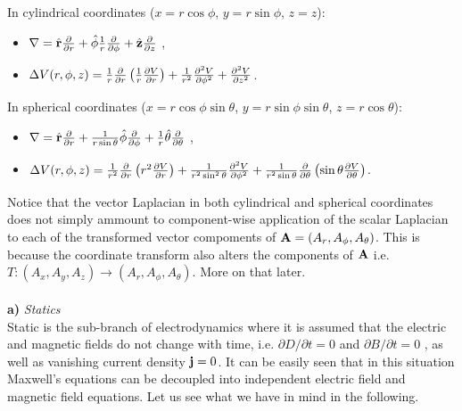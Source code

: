 \documentclass[11pt,a4paper]{report}
\def\Nabla{\ensuremath\bm{\nabla}}
\def\bm{\ensuremath\mathbf}
\def\lap{\ensuremath\Delta}
\begin{document}
In cylindrical coordinates ($x=r\cos\phi$, $y = r\sin\phi$, $z = z$): 
\begin{itemize}
  \item {$\Nabla = \hat{\bm {r}} \frac{\partial }{\partial r}+\hat{\bm{\phi}} \frac{1}{r}\frac{\partial}{\partial \bm{\phi}} + \hat{\bm{z}}\frac{\partial}{\partial z} $} ,
  \item {$\lap V(r,\phi,z) = \frac{1}{r}\frac{\partial}{\partial r}\left ( \frac{1}{r}\frac{\partial V}{\partial r}\right ) + \frac{1}{r^2}\frac{\partial ^2 V}{\partial \phi ^2} + \frac{\partial ^2 V }{\partial z^2} $.}
\end{itemize}

In spherical coordinates ($x=r\cos\phi \sin\theta$, $y = r\sin\phi\sin\theta$, $z = r\cos\theta$):
\begin{itemize}
  \item{$\Nabla = \hat{\bm{r}} \frac{\partial }{\partial r}+\frac{1}{r\sin\theta}\hat{\bm{\phi}} \frac{\partial}{\partial \phi} + \frac{1}{r}\hat{\bm{\theta}}\frac{\partial}{\partial \theta}$} ,
  \item{$\lap V(r,\phi,z) = \frac{1}{r^2}\frac{\partial}{\partial r}\left ( r^2\frac{\partial V}{\partial r}\right ) + \frac{1}{r^2 \sin^2\theta}\frac{\partial ^2 V}{\partial \phi ^2}
    + \frac{1}{r^2\sin\theta} \frac{\partial}{\partial \theta}\left ( \sin\theta \frac{\partial V}{\partial \theta } \right ) $.} 
\end{itemize}

Notice that the vector Laplacian in both cylindrical and spherical coordinates does not simply ammount to component-wise application of the scalar Laplacian to each of the transformed vector compoments of $\bm{A} = (A_r,A_\phi,A_\theta)$. This is because the coordinate transform also alters the components of $\bm{A}$ i.e. $T: (A_x,A_y,A_z)\rightarrow (A_r,A_\phi,A_\theta)$. More on that later. 
\\\\
\textbf{a)} \emph{Statics} \\

Static is the sub-branch of electrodynamics where it is assumed that the electric and magnetic fields do not change with time, i.e. $\partial D / \partial t = 0 $ and $\partial B / \partial t = 0 $ , as well as vanishing current density  $\bm{j} = 0 $. It can be easily seen that in this situation Maxwell's equations can be decoupled into independent electric field and magnetic field equations. Let us see what we have in mind in the following. 
\end{document}
